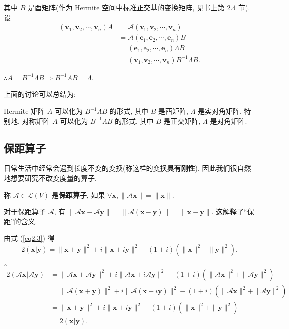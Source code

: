 \documentclass{ctexart}
\begin{document}
其中 $B$ 是酉矩阵(作为 Hermite 空间中标准正交基的变换矩阵, 见书上第 2.4 节). 设
\begin{align*}
    (\boldsymbol{v}_1,\boldsymbol{v}_2,\cdots,\boldsymbol{v}_n)A & =\mathcal{A}(\boldsymbol{v}_1,\boldsymbol{v}_2,\cdots,\boldsymbol{v}_n) \\
    & =\mathcal{A}(\boldsymbol{e}_1,\boldsymbol{e}_2,\cdots,\boldsymbol{e}_n)B \\
    & =(\boldsymbol{e}_1,\boldsymbol{e}_2,\cdots,\boldsymbol{e}_n)\Lambda B \\
    & =(\boldsymbol{v}_1,\boldsymbol{v}_2,\cdots,\boldsymbol{v}_n)B^{-1}\Lambda B.
\end{align*}

$\therefore A=B^{-1}\Lambda B\Rightarrow B^{-1}AB=\Lambda$.

上面的讨论可以总结为:
\begin{corollary}\label{c3.2}
    Hermite 矩阵 $A$ 可以化为 $B^{-1}\Lambda B$ 的形式, 其中 $B$ 是酉矩阵, $\Lambda$ 是实对角矩阵. 特别地, 对称矩阵 $A$ 可以化为 $B^{-1}\Lambda B$ 的形式, 其中 $B$ 是正交矩阵, $\Lambda$ 是对角矩阵.
\end{corollary}
\subsection{保距算子}
日常生活中经常会遇到长度不变的变换(称这样的变换\textbf{具有刚性}), 因此我们很自然地想要研究不改变度量的算子.
\begin{definition}
    称 $\mathcal{A}\in\mathcal{L}(V)$ 是\textbf{保距算子}, 如果 $\forall\boldsymbol{x},\|\mathcal{A}\boldsymbol{x}\|=\|\boldsymbol{x}\|$.
\end{definition}
对于保距算子 $\mathcal{A}$, 有 $\|\mathcal{A}\boldsymbol{x}-\mathcal{A}\boldsymbol{y}\|=\|\mathcal{A}(\boldsymbol{x}-\boldsymbol{y})\|=\|\boldsymbol{x}-\boldsymbol{y}\|$. 这解释了``保距''的含义.

由式 (\ref{eq2.3}) 得
\[2(\boldsymbol{x}|\boldsymbol{y})=\|\boldsymbol{x}+\boldsymbol{y}\|^2+i\|\boldsymbol{x}+i\boldsymbol{y}\|^2-(1+i)(\|\boldsymbol{x}\|^2+\|\boldsymbol{y}\|^2).\]

$\therefore$
\begin{align*}
    2(\mathcal{A}\boldsymbol{x}|\mathcal{A}\boldsymbol{y}) & =\|\mathcal{A}\boldsymbol{x}+\mathcal{A}\boldsymbol{y}\|^2+i\|\mathcal{A}\boldsymbol{x}+i\mathcal{A}\boldsymbol{y}\|^2-(1+i)(\|\mathcal{A}\boldsymbol{x}\|^2+\|\mathcal{A}\boldsymbol{y}\|^2) \\
    & =\|\mathcal{A}(\boldsymbol{x}+\boldsymbol{y})\|^2+i\|\mathcal{A}(\boldsymbol{x}+i\boldsymbol{y})\|^2-(1+i)(\|\mathcal{A}\boldsymbol{x}\|^2+\|\mathcal{A}\boldsymbol{y}\|^2) \\
    & =\|\boldsymbol{x}+\boldsymbol{y}\|^2+i\|\boldsymbol{x}+i\boldsymbol{y}\|^2-(1+i)(\|\boldsymbol{x}\|^2+\|\boldsymbol{y}\|^2) \\
    & =2(\boldsymbol{x}|\boldsymbol{y}).
\end{align*}
\end{document}
